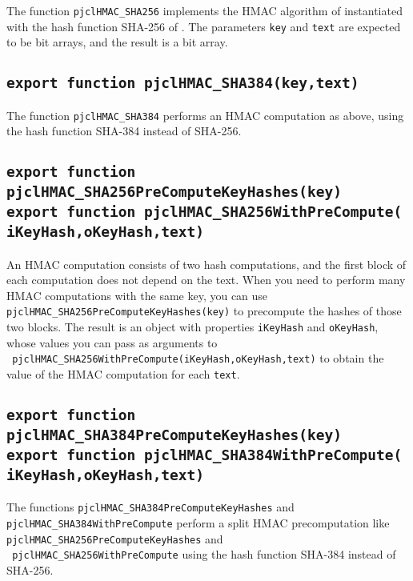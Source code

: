\documentclass[12pt]{article}
\begin{document}
The function {\tt pjclHMAC\_SHA256} implements the HMAC algorithm of
\cite{FIPS198-1} instantiated with the hash function SHA-256 of
\cite{FIPS180-4}.  The parameters {\tt key} and {\tt text} are
expected to be bit arrays, and the result is a bit array.

\subsection{\tt export function pjclHMAC\_SHA384(key,text)}

The function {\tt pjclHMAC\_SHA384} performs an HMAC computation as above, 
using the hash function SHA-384 instead of SHA-256.

\subsection{\tt export function pjclHMAC\_SHA256PreComputeKeyHashes(key)\\export function pjclHMAC\_SHA256WithPreCompute(\\\mbox{}\hspace{.2in}iKeyHash,oKeyHash,text)}

An HMAC computation consists of two hash computations, and the first
block of each computation does not depend on the text.  When you need
to perform many HMAC computations with the same key, you can use
{\tt pjclHMAC\_SHA256PreComputeKeyHashes(key)} to precompute the hashes
of those two blocks.  The result is an object with properties {\tt iKeyHash}
and {\tt oKeyHash}, whose values you can pass as arguments to\\{\tt
  pjclHMAC\_SHA256WithPreCompute(iKeyHash,oKeyHash,text)} to obtain the
value of the HMAC computation for each {\tt text}.

\subsection{\tt export function pjclHMAC\_SHA384PreComputeKeyHashes(key)\\export function pjclHMAC\_SHA384WithPreCompute(\\\mbox{}\hspace{.2in}iKeyHash,oKeyHash,text)}

The functions {\tt pjclHMAC\_SHA384PreComputeKeyHashes} and {\tt
  pjclHMAC\_SHA384WithPreCompute} perform a split HMAC precomputation
like {\tt pjclHMAC\_SHA256PreComputeKeyHashes} and\\{\tt
  pjclHMAC\_SHA256WithPreCompute} using the hash function SHA-384
instead of SHA-256.
\end{document}
